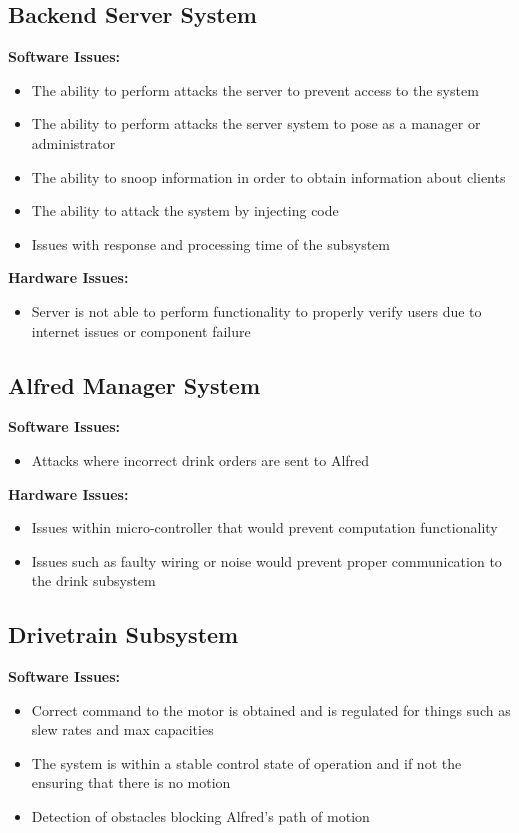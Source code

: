 \documentclass [10pt]{article}
\begin{document}
\subsection{Backend Server System}
	\textbf{Software Issues:}
		\begin {itemize}
			\item The ability to perform attacks the server to prevent access to the system
			\item The ability to perform attacks the server system to pose as a manager or administrator
			\item The ability to snoop information in order to obtain information about clients
			\item The ability to attack the system by injecting code
			\item Issues with response and processing time of the subsystem
		\end {itemize}
		
	\textbf{Hardware Issues:}
		\begin {itemize}
			\item Server is not able to perform functionality to properly verify users due to internet issues or component failure
		\end {itemize}
\subsection{Alfred Manager System}
	\textbf{Software Issues:}
		\begin {itemize}
			\item Attacks where incorrect drink orders are sent to Alfred
		\end {itemize}
		
	\textbf{Hardware Issues:}
		\begin {itemize}
			\item Issues within micro-controller that would prevent computation functionality
			\item Issues such as faulty wiring or noise would prevent proper communication to the drink subsystem
		\end {itemize}
\subsection{Drivetrain Subsystem}
	\textbf{Software Issues:}
		\begin {itemize}
			\item Correct command to the motor is obtained and is regulated for things such as slew rates and max capacities
			\item The system is within a stable control state of operation and if not the ensuring that there is no motion
			\item Detection of obstacles blocking Alfred's path of motion
		\end {itemize}
		
\end{document}
